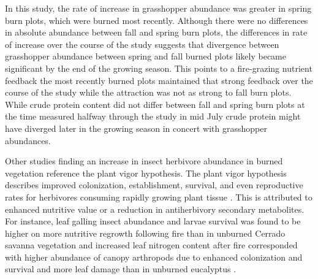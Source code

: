 \documentclass[referee, 
	            sn-basic]
           {sn-jnl}
\begin{document}
\begin{linenumbers}
In this study, the rate of increase in grasshopper abundance was greater in spring burn plots, which were burned most recently. Although there were no differences in absolute abundance between fall and spring burn plots, the differences in rate of increase over the course of the study suggests that divergence between grasshopper abundance between spring and fall burned plots likely became significant by the end of the growing season. This points to a fire-grazing nutrient feedback \textemdash the most recently burned plots maintained that strong feedback over the course of the study while the attraction was not as strong to fall burn plots. While crude protein content did not differ between fall and spring burn plots at the time measured \textemdash halfway through the study in mid July \textemdash crude protein might have diverged later in the growing season in concert with grasshopper abundances. 

Other studies finding an increase in insect herbivore abundance in burned vegetation reference the plant vigor hypothesis. The plant vigor hypothesis describes improved colonization, establishment, survival, and even reproductive rates for herbivores consuming rapidly growing plant tissue \citep{price1991}. This is attributed to enhanced nutritive value or a reduction in antiherbivory secondary metabolites. For instance, leaf galling insect abundance and larvae survival was found to be higher on more nutritive regrowth following fire than in unburned Cerrado savanna vegetation \citep{vieira1996} and increased leaf nitrogen content after fire corresponded with higher abundance of canopy arthropods due to enhanced colonization and survival and more leaf damage than in unburned eucalyptus \citep{radhotoly2001}. 


\end{linenumbers}
\end{document}
